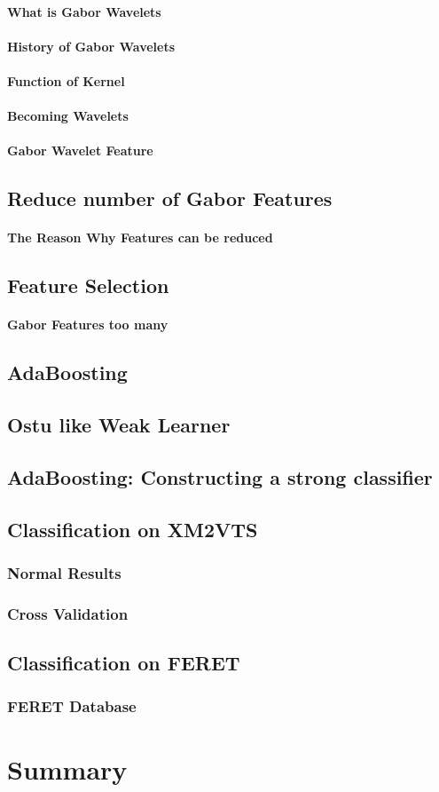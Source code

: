 \paragraph{What is Gabor Wavelets}
\paragraph{History of Gabor Wavelets}
\paragraph{Function of Kernel}
\paragraph{Becoming Wavelets}
\paragraph{Gabor Wavelet Feature}

\subsection{Reduce number of Gabor Features}
\paragraph{The Reason Why Features can be reduced}

\subsection{Feature Selection}
\paragraph{Gabor Features too many}


\subsection{AdaBoosting}
\subsection{Ostu like Weak Learner}
\subsection{AdaBoosting: Constructing a strong classifier}
\subsection{Classification on XM2VTS}
\subsubsection{Normal Results}
\subsubsection{Cross Validation}
\subsection{Classification on FERET}
\subsubsection{FERET Database}
\section{Summary}